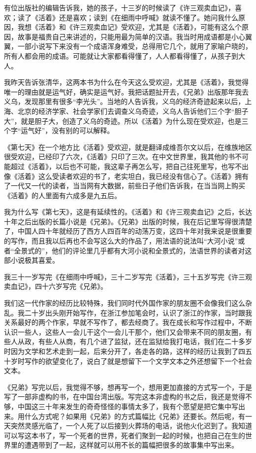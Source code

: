 \documentclass[12pt,a5paper]{ctexbook}
\begin{document}
有位出版社的编辑告诉我，她的孩子，十三岁的时候读了《许三观卖血记》，喜欢；读了《活着》还是喜欢；读到《在细雨中呼喊》就读不懂了。她问我什么原因，我想《活着》和《许三观卖血记》受欢迎，尤其是《活着》，可能有这么个原因，故事是福贵自己来讲述的，只能用最为简单的汉语。我当时用成语都是小心翼翼，一部小说写下来没有一个成语浑身难受，总得用它几个，就用了家喻户晓的，所有人都会用的成语。可能就让大家都看得懂了，人人都看得懂了，从孩子到大人。

我昨天告诉张清华，这两本书为什么在今天这么受欢迎，尤其是《活着》，我觉得唯一的理由就是运气好，确实是运气好。我把话题扯开去，《兄弟》出版那年我去义乌，发现那里有很多“李光头”。当地的人告诉我，义乌的经济奇迹起来以后，上海、北京的经济学家、社会学家们去调查义乌奇迹，义乌人告诉他们三个字“胆子大”，就是胆子大，创造了义乌的奇迹。所以《活着》为什么现在受欢迎，也是三个字“运气好”，没有别的可以解释。

《第七天》在一个地方比《活着》受欢迎，就是翻译成维吾尔文以后，在维族地区很受欢迎，已经印了六次，《活着》只印了三次。在中文世界里，我其他的书不可能超过《活着》，以后也不可能，我这辈子再怎么写，把自己往死里写，也写不出像《活着》这么受读者欢迎的书了，老实坦白，我已经没有信心了。《活着》拥有了一代又一代的读者，当当网有大数据，前些日子他们告诉我，在当当网上购买《活着》的人里面有六成多是九五后。

我为什么写《第七天》，这是有延续性的。《活着》和《许三观卖血记》之后，长达十年之后出版的长篇小说是《兄弟》。《兄弟》出版的时候，我在后记里写得很清楚了，中国人四十年就经历了西方人四百年的动荡万变，这四十年对我来说是很重要的写作，而且我以后再也不会写这么大的作品了，用法语的说法叫“大河小说”或者“全景式的”，他们的评论里几乎都有大河小说和全景式的，法语世界的读者对这部小说极其喜爱。

我三十一岁写完《在细雨中呼喊》，三十二岁写完《活着》，三十五岁写完《许三观卖血记》，四十六岁写完《兄弟》。

我们这一代作家的经历比较特殊，我们同时代外国作家的朋友圈不会像我们这么杂乱。我二十岁出头刚开始写作，在浙江参加笔会时，认识了浙江的作家，当时跟我关系最好的两个作家，早就不写作了，都去经商了。我在成长和写作过程中，不断认识一些人，这些人一会儿干这个一会儿干那个，他们又会带来不同的朋友圈，有些人从政，有些人从商，有几个进了监狱，还在监狱给我打电话，我们在二十多岁时因为文学和艺术走到一起，后来分开了，各走各的路，这样的经历让我到了四五十岁时写作的欲望变化了，说白了就是想留下一个文学文本之外还想留下一个社会文本。

《兄弟》写完以后，我觉得不够，想再写一个，想用更加直接的方式写一个，于是写了一部非虚构的书，在中国台湾出版。写完这本非虚构的书之后，我还是觉得不够，中国这三十年来发生的奇奇怪怪的事情太多了，我有个愿望是把它集中写出来。用什么方式呢？如果用《兄弟》的方式篇幅比《兄弟》还要长。然后呢，有一天突然灵感光临了，一个人死了以后接到火葬场的电话，说他火化迟到了。我知道可以写这本书了，写一个死者的世界，死者们聚到一起的时候，也把自己在生的世界里的遭遇带到了一起，这样就可以用不长的篇幅把很多的故事集中写出来。
\end{document}
